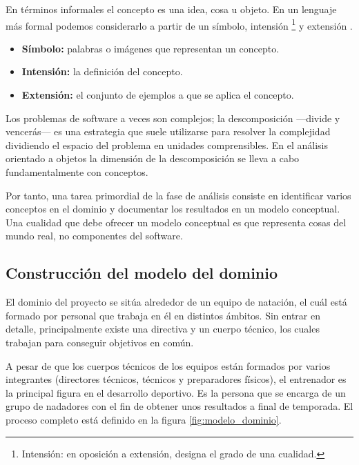 	En términos informales el concepto es una idea, cosa u objeto. En un lenguaje más formal podemos considerarlo a partir de un símbolo, intensión \footnote{Intensión: en oposición a extensión, designa el grado de una cualidad.} y extensión \cite{MO95}.
	
	\begin{itemize}
		\item{{\bf Símbolo:} palabras o imágenes que representan un concepto.}
		\item{{\bf Intensión:} la definición del concepto.}
		\item{{\bf Extensión:} el conjunto de ejemplos a que se aplica el concepto.}
	\end{itemize}
	
	Los problemas de software a veces son complejos; la descomposición ---divide y vencerás--- es una estrategia que suele utilizarse para resolver la complejidad dividiendo el espacio del problema en unidades comprensibles. En el análisis orientado a objetos la dimensión de la descomposición se lleva a cabo fundamentalmente con conceptos.
		
	Por tanto, una tarea primordial de la fase de análisis consiste en identificar varios conceptos en el dominio y documentar los resultados en un modelo conceptual. Una cualidad que debe ofrecer un modelo conceptual es que representa cosas del mundo real, no componentes del software.
	

%
%
\subsection{Construcción del modelo del dominio} %
	\label{sub:construccion_del_modelo_del_dominio}

	El dominio del proyecto se sitúa alrededor de un equipo de natación, el cuál está formado por personal que trabaja en él en distintos ámbitos. Sin entrar en detalle, principalmente existe una directiva y un cuerpo técnico, los cuales trabajan para conseguir objetivos en común.  
	
	 A pesar de que los cuerpos técnicos de los equipos están formados por varios integrantes (directores técnicos, técnicos y preparadores físicos), el entrenador es la principal figura en el desarrollo deportivo. Es la persona que se encarga de un grupo de nadadores con el fin de obtener unos resultados a final de temporada. El proceso completo está definido en la figura \ref{fig:modelo_dominio}.
	

